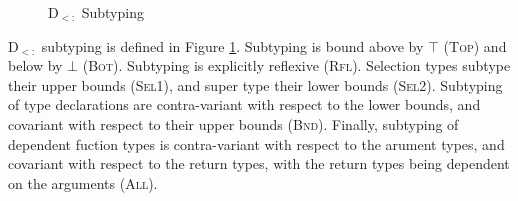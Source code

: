 \documentclass[runningheads]{llncs}
\begin{document}
\begin{figure}[t]
\small
{}
\caption{D$_{<:}$ Subtyping}
\label{f:dsub:subtyping}
\end{figure}
D$_{<:}$ subtyping is defined in Figure \ref{f:dsub:subtyping}. Subtyping is bound above by $\top$ (\textsc{Top}) and below by $\bot$ (\textsc{Bot}).
Subtyping is explicitly reflexive (\textsc{Rfl}). Selection types subtype their upper bounds (\textsc{Sel1}), and super type their lower bounds (\textsc{Sel2}).
Subtyping of type declarations are contra-variant with respect to the lower bounds, and covariant with respect to their upper bounds (\textsc{Bnd}).
Finally, subtyping of dependent fuction types is contra-variant with respect to the arument types, and covariant with respect to the return types, 
with the return types being dependent on the arguments (\textsc{All}).
\end{document}
